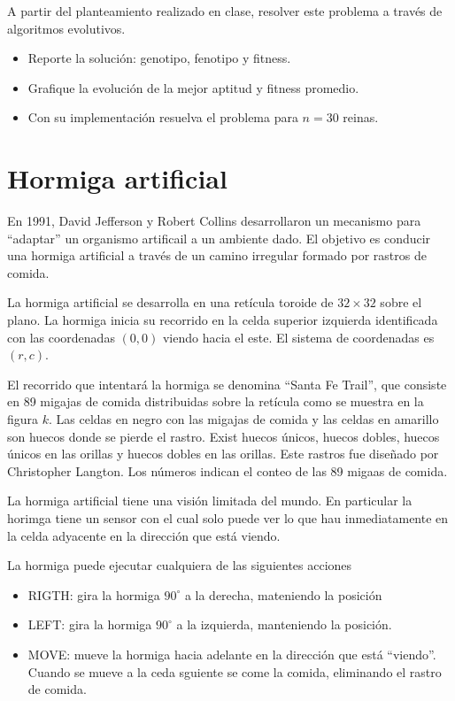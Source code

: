 \documentclass[twocolumn]{article}
\begin{document}
A partir del planteamiento realizado en clase, resolver este problema a través
de algoritmos evolutivos.
\begin{itemize}
  \item Reporte la solución: genotipo, fenotipo y fitness.
  \item Grafique la evolución de la mejor aptitud y fitness promedio.
  \item Con su implementación resuelva el problema para $n=30$ reinas.
\end{itemize}

\section{Hormiga artificial}

En 1991, David Jefferson y Robert Collins desarrollaron un mecanismo para
``adaptar'' un organismo artificail a un ambiente dado. El objetivo es conducir
una hormiga artificial a través de un camino irregular formado por rastros de
comida.

La hormiga artificial se desarrolla en una retícula toroide de $32\times 32$
sobre el plano. La hormiga inicia su recorrido en la celda superior izquierda
identificada con las coordenadas $(0, 0)$ viendo hacia el este. El sistema de
coordenadas es $(r, c)$.

El recorrido que intentará la hormiga se denomina ``Santa Fe Trail'', que
consiste en 89 migajas de comida distribuidas sobre la retícula como se muestra
en la figura $k$. Las celdas en negro con las migajas de comida y las celdas en
amarillo son huecos donde se pierde el rastro. Exist huecos únicos, huecos
dobles, huecos únicos en las orillas y huecos dobles en las orillas. Este
rastros fue diseñado por Christopher Langton. Los números indican el conteo de
las 89 migaas de comida.

La hormiga artificial tiene una visión limitada del mundo. En particular la
horimga tiene un sensor con el cual solo puede ver lo que hau inmediatamente en
la celda adyacente en la dirección que está viendo.

La hormiga puede ejecutar cualquiera de las siguientes acciones

\begin{itemize}
  \item \textsc{RIGTH}: gira la hormiga $90^{\circ}$ a la derecha, mateniendo la
    posición
  \item \textsc{LEFT}: gira la hormiga $90^{\circ}$ a la izquierda, manteniendo
    la posición.
  \item \textsc{MOVE}: mueve la hormiga hacia adelante en la dirección que está
    ``viendo''. Cuando se mueve a la ceda sguiente se come la comida, eliminando
    el rastro de comida.
\end{itemize}
\end{document}
